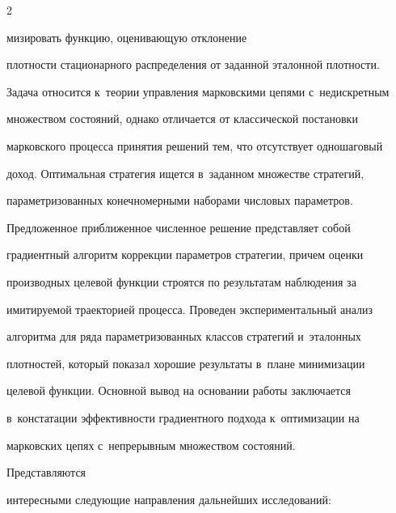 \begin{multicols}{2}





\noindent


мизировать функцию, оценивающую отклонение 


плотности стационарного распределения от заданной эталонной плот\-ности. 


Задача относится к~теории управ\-ле\-ния марковскими цепями с~недискретным 


множеством со\-сто\-яний, однако отличается от классической постановки 


марковского процесса принятия решений тем, что отсутствует одношаговый 


доход. Оптимальная стратегия ищется в~заданном множестве стратегий, 


параметризованных конечномерными наборами чис\-ло\-вых па\-ра\-мет\-ров. 





Предложенное при\-бли\-жен\-ное чис\-лен\-ное решение пред\-став\-ля\-ет собой 


градиентный алгоритм коррекции па\-ра\-мет\-ров стратегии, причем оценки\linebreak 


производных целевой функции строятся по результатам наблюдения за 


имитируемой траекторией процесса. Проведен экспериментальный анализ 


алгоритма для ряда па\-ра\-мет\-ри\-зо\-ван\-ных классов стратегий и~эталонных 


плотностей, который показал хорошие результаты в~плане минимизации 


целевой функции. Основной вывод на основании работы за\-клю\-ча\-ет\-ся 


в~констатации эффективности градиентного подхода к~оптимизации на 


марковских цепях с~непрерывным множеством со\-сто\-яний. 





Пред\-став\-ля\-ют\-ся 


интересными сле\-ду\-ющие на\-прав\-ле\-ния дальнейших исследований:







\end{multicols}
